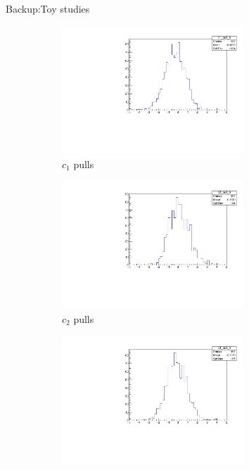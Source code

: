 \documentclass{beamer}
\begin{document}
\begin{frame}{Backup:Toy studies}
  \begin{figure}
    \centering
    \begin{subfigure}{0.5\textwidth}
      \centering
      \includegraphics[width=0.75\textwidth,trim={0 0 0 0},clip=true]{Plots/c1_ToyFits_pull.pdf}
      \caption{$c_1$ pulls}
    \end{subfigure}%
    \begin{subfigure}{0.5\textwidth}
      \centering
      \includegraphics[width=0.75\textwidth,trim={0 0 0 0},clip=true]{Plots/c2_ToyFits_pull.pdf}
      \caption{$c_2$ pulls}
    \end{subfigure}
    \begin{subfigure}{0.5\textwidth}
      \centering
      \includegraphics[width=0.75\textwidth,trim={0 0 0 0},clip=true]{Plots/c3_ToyFits_pull.pdf}

\end{subfigure}
\end{figure}
\end{frame}
\end{document}
